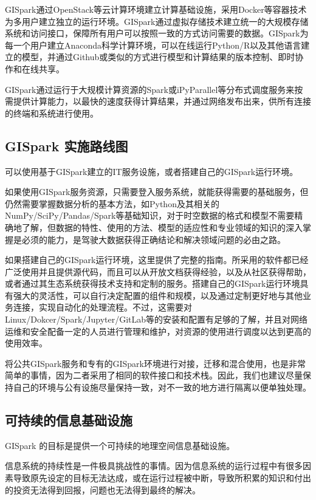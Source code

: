 \documentclass[letterpaper,10pt,english]{sphinxmanual}
\begin{document}
GISpark通过OpenStack等云计算环境建立计算基础设施，采用Docker等容器技术为多用户建立独立的运行环境。GISpark通过虚拟存储技术建立统一的大规模存储系统和访问接口，保障所有用户可以按照一致的方式访问需要的数据。GISpark为每一个用户建立Anaconda科学计算环境，可以在线运行Python/R以及其他语言建立的模型，并通过Github或类似的方式进行模型和计算结果的版本控制、即时协作和在线共享。

GISpark通过运行于大规模计算资源的Spark或iPyParallel等分布式调度服务来按需提供计算能力，以最快的速度获得计算结果，并通过网络发布出来，供所有连接的终端和系统进行使用。


\subsection{GISpark 实施路线图}
\label{gispark_profile:GISpark-_u5b9e_u65bd_u8def_u7ebf_u56fe}
可以使用基于GISpark建立的IT服务设施，或者搭建自己的GISpark运行环境。

如果使用GISpark服务资源，只需要登入服务系统，就能获得需要的基础服务，但仍然需要掌握数据分析的基本方法，如Python及其相关的NumPy/SciPy/Pandas/Spark等基础知识，对于时空数据的格式和模型不需要精确地了解，但数据的特性、使用的方法、模型的适应性和专业领域的知识的深入掌握是必须的能力，是驾驶大数据获得正确结论和解决领域问题的必由之路。

如果搭建自己的GISpark运行环境，这里提供了完整的指南。所采用的软件都已经广泛使用并且提供源代码，而且可以从开放文档获得经验，以及从社区获得帮助，或者通过其生态系统获得技术支持和定制的服务。搭建自己的GISpark运行环境具有强大的灵活性，可以自行决定配置的组件和规模，以及通过定制更好地与其他业务连接，实现自动化的处理流程。不过，这需要对Linux/Dokcer/Spark/Jupyter/GitLab等的安装和配置有足够的了解，并且对网络运维和安全配备一定的人员进行管理和维护，对资源的使用进行调度以达到更高的使用效率。

将公共GISpark服务和专有的GISpark环境进行对接，迁移和混合使用，也是非常简单的事情，因为二者采用了相同的软件接口和技术栈。因此，我们也建议尽量保持自己的环境与公有设施尽量保持一致，对不一致的地方进行隔离以便单独处理。


\subsection{可持续的信息基础设施}
\label{gispark_profile:_u53ef_u6301_u7eed_u7684_u4fe1_u606f_u57fa_u7840_u8bbe_u65bd}
GISpark 的目标是提供一个可持续的地理空间信息基础设施。

信息系统的持续性是一件极具挑战性的事情。因为信息系统的运行过程中有很多因素导致原先设定的目标无法达成，或在运行过程被中断，导致所积累的知识和付出的投资无法得到回报，问题也无法得到最终的解决。
\end{document}
